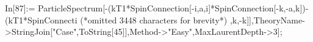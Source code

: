 In[87]:= ParticleSpectrum[-(kT1*SpinConnection[-i,a,i]*SpinConnection[-k,-a,k])-(kT1*SpinConnecti (*omitted 3448 characters for brevity*) ,k,-k]],TheoryName->StringJoin["Case",ToString[45]],Method->"Easy",MaxLaurentDepth->3];